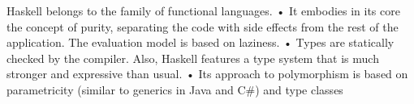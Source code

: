 Haskell belongs to the family of functional languages.
• It embodies in its core the concept of purity, separating the code with
side eﬀects from the rest of the application.
The evaluation model is based on laziness.
• Types are statically checked by the compiler. Also, Haskell features a
type system that is much stronger and expressive than usual.
• Its approach to polymorphism is based on parametricity (similar to
generics in Java and C#) and type classes